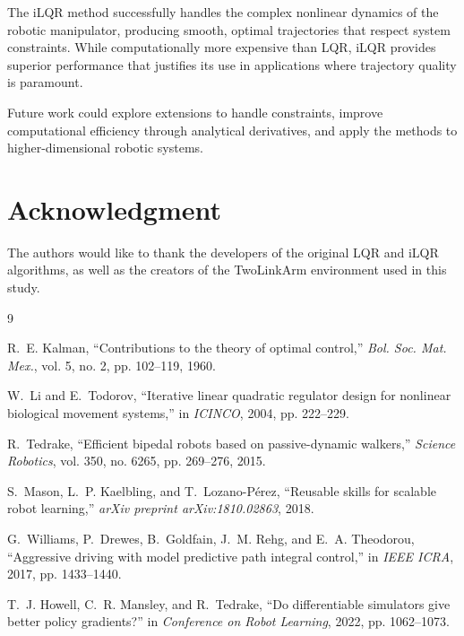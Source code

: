 \documentclass[conference]{IEEEtran}
\begin{document}
The iLQR method successfully handles the complex nonlinear dynamics of the robotic manipulator, producing smooth, optimal trajectories that respect system constraints. While computationally more expensive than LQR, iLQR provides superior performance that justifies its use in applications where trajectory quality is paramount.

Future work could explore extensions to handle constraints, improve computational efficiency through analytical derivatives, and apply the methods to higher-dimensional robotic systems.

\section*{Acknowledgment}

The authors would like to thank the developers of the original LQR and iLQR algorithms, as well as the creators of the TwoLinkArm environment used in this study.

\begin{thebibliography}{9}

R.~E. Kalman, ``Contributions to the theory of optimal control,'' \emph{Bol. Soc. Mat. Mex.}, vol. 5, no. 2, pp. 102--119, 1960.

W.~Li and E.~Todorov, ``Iterative linear quadratic regulator design for nonlinear biological movement systems,'' in \emph{ICINCO}, 2004, pp. 222--229.

R.~Tedrake, ``Efficient bipedal robots based on passive-dynamic walkers,'' \emph{Science Robotics}, vol. 350, no. 6265, pp. 269--276, 2015.

S.~Mason, L.~P. Kaelbling, and T.~Lozano-P{\'e}rez, ``Reusable skills for scalable robot learning,'' \emph{arXiv preprint arXiv:1810.02863}, 2018.

G.~Williams, P.~Drewes, B.~Goldfain, J.~M. Rehg, and E.~A. Theodorou, ``Aggressive driving with model predictive path integral control,'' in \emph{IEEE ICRA}, 2017, pp. 1433--1440.

T.~J. Howell, C.~R. Mansley, and R.~Tedrake, ``Do differentiable simulators give better policy gradients?'' in \emph{Conference on Robot Learning}, 2022, pp. 1062--1073.

\end{thebibliography}

\appendices
\end{document}

